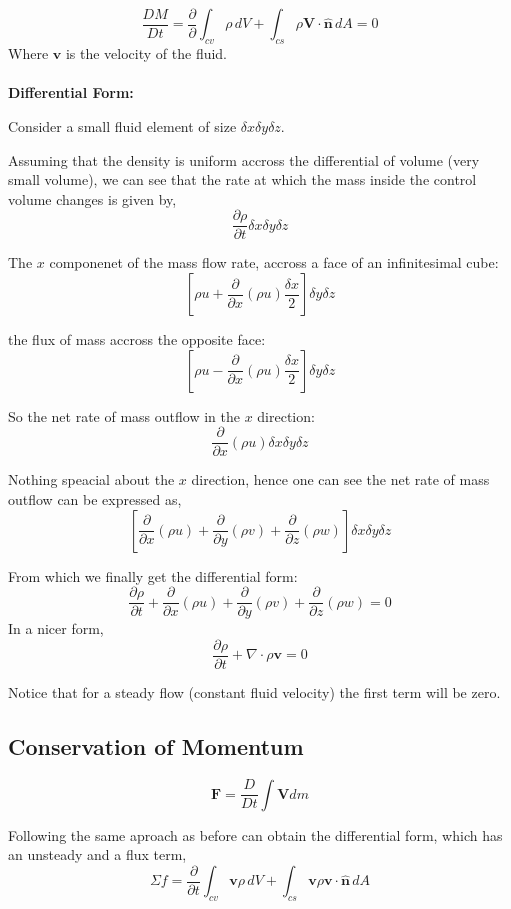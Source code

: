 \documentclass[10pt,a4paper,draft]{article}
\begin{document}
$$
\frac{DM}{Dt} = 
\frac{\partial}{\partial} \int_{cv} \rho \, dV 
+ \int_{cs}  \rho \mathbf{V} \cdot \mathbf{\hat{n}} \, dA
= 0
$$
Where $\mathbf{v}$ is the velocity of the fluid. \\~\\

\textbf{Differential Form:}

Consider a small fluid element of size $\delta x \delta y \delta z$.

Assuming that the density is uniform accross the differential of volume (very small volume), we can see that the rate at which the mass inside the control volume changes is given by,
$$
\frac{\partial \rho}{\partial t} \delta x \delta y \delta z
$$

The $x$ componenet of the mass flow rate, accross a face of an infinitesimal cube:
$$
\left[ 
\rho u 
+ \frac{\partial}{\partial x} \left(\rho u\right) \frac{\delta x}{2}
\right] \delta y \delta z
$$

the flux of mass accross the opposite face:
$$
\left[
\rho u
- \frac{\partial}{\partial x}\left(\rho u\right) \frac{\delta x}{2}
\right] \delta y \delta z
$$

So the net rate of mass outflow in the $x$ direction:
$$
\frac{\partial}{\partial x}\left(\rho u\right) \delta x \delta y \delta z
$$

Nothing speacial about the $x$ direction, hence one can see the net rate of mass outflow can be expressed as,
$$
\left[ 
\frac{\partial}{\partial x}\left(\rho u\right) + \frac{\partial}{\partial y}\left(\rho v\right) + \frac{\partial}{\partial z}\left(\rho w\right)
\right]
\delta x \delta y \delta z
$$

From which we finally get the differential form:
$$
\frac{\partial \rho}{\partial t} 
+ \frac{\partial}{\partial x}\left(\rho u\right) + \frac{\partial}{\partial y}\left(\rho v\right) + \frac{\partial}{\partial z}\left(\rho w\right)
= 0
$$
In a nicer form,
$$
\frac{\partial \rho}{\partial t} + \nabla \cdot \rho\mathbf{v} = 0
$$

Notice that for a steady flow (constant fluid velocity) the first term will be zero.




\subsection{Conservation of Momentum}
$$
\mathbf{F} 
= \frac{D}{D t} \int \mathbf{V} dm 
$$

Following the same aproach as before can obtain the differential form, which has an unsteady and a flux term, 
$$
\Sigma f
= \frac{\partial}{\partial t} \int_{cv} \mathbf{v} \rho \, dV
+ \int_{cs} \mathbf{v} \rho \mathbf{v}\cdot\mathbf{\hat{n}} \, dA
$$
\end{document}
